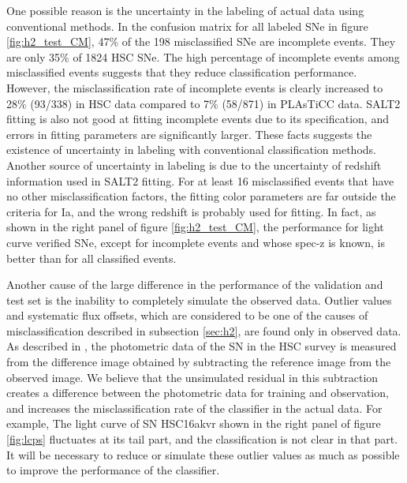 \documentclass[proof]{pasj01}
\begin{document}
One possible reason is the uncertainty in the labeling of actual data using conventional methods.
In the confusion matrix for all labeled SNe in figure \ref{fig:h2_test_CM}, 47\% of the 198 misclassified SNe are incomplete events.
They are only 35\% of 1824 HSC SNe.
The high percentage of incomplete events among misclassified events suggests that they reduce classification performance. %
However, the misclassification rate of incomplete events is clearly increased to 28\% (93/338) in HSC data compared to 7\% (58/871) in PLAsTiCC data.
SALT2 fitting is also not good at fitting incomplete events due to its specification, and errors in fitting parameters are significantly larger.
These facts suggests the existence of uncertainty in labeling with conventional classification methods.
Another source of uncertainty in labeling is due to the uncertainty of redshift information used in SALT2 fitting.
For at least 16 misclassified events that have no other misclassification factors, the fitting color parameters are far outside the criteria for Ia, and the wrong redshift is probably used for fitting.
In fact, as shown in the right panel of figure \ref{fig:h2_test_CM}, the performance for light curve verified SNe, except for incomplete events and whose spec-z is known, is better than for all classified events.

Another cause of the large difference in the performance of the validation and test set is the inability to completely simulate the observed data.
Outlier values and systematic flux offsets, which are considered to be one of the causes of misclassification described in subsection \ref{sec:h2}, are found only in observed data.
As described in \citet{yasuda19a}, the photometric data of the SN in the HSC survey is measured from the difference image obtained by subtracting the reference image from the observed image.
We believe that the unsimulated residual in this subtraction creates a difference between the photometric data for training and observation, and increases the misclassification rate of the classifier in the actual data.
For example, The light curve of SN HSC16akvr shown in the right panel of figure \ref{fig:lcps} fluctuates at its tail part, and the classification is not clear in that part.
It will be necessary to reduce or simulate these outlier values as much as possible to improve the performance of the classifier.
%
%
%
\end{document}
